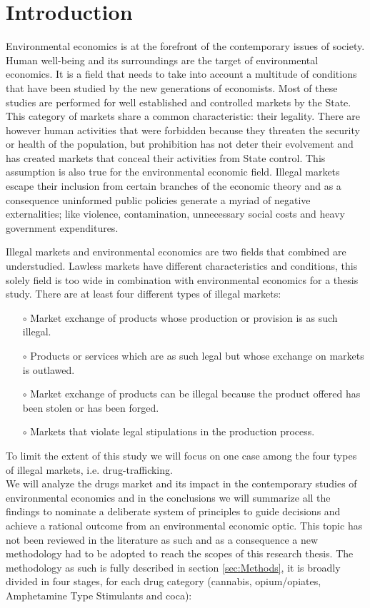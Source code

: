 \chapter*{Introduction} 

Environmental economics is at the forefront of the contemporary issues of society. Human well-being and its surroundings are the target of environmental economics. It is a field that needs to take into account a multitude of conditions that have been studied by the new generations of economists. Most of these studies are performed for well established and controlled markets by the State. This category of markets share a common characteristic: their legality. There are however human activities that were forbidden because they threaten the security or health of the population, but prohibition has not deter their evolvement  and has created markets that conceal their activities from State control. This assumption is also true for the environmental economic field. Illegal markets escape their inclusion from certain branches of the economic theory and as a consequence uninformed public policies generate a myriad of negative externalities; like violence, contamination, unnecessary social costs and heavy government expenditures.

Illegal markets and environmental economics are two fields that combined are understudied.
Lawless markets have different characteristics and conditions, this solely field is too wide in combination with environmental economics for a thesis study.
There are at least four different types of illegal markets: 
\begin{itemize}\justifying
\item[$\circ$] Market exchange of products whose production or provision is as such illegal.
\item[$\circ$] Products or services which are as such legal but whose exchange on markets is outlawed.
\item[$\circ$] Market exchange of products can be illegal because the product offered has been stolen or has been forged.
\item[$\circ$] Markets that violate legal stipulations in the production process.
\end{itemize} 
To limit the extent of this study we will focus on one case among the four types of illegal markets, i.e. drug-trafficking. \\
We will analyze the drugs market and its impact in the contemporary studies of environmental economics and in the conclusions we will summarize all the findings to nominate a deliberate system of principles to guide decisions and achieve a rational outcome from an environmental economic optic. This topic has not been reviewed in the literature as such and as a consequence a new methodology had to be adopted to reach the scopes of this research thesis. The methodology as such is fully described in section \ref{sec:Methods}, it is broadly divided in four stages, for each drug category (cannabis, opium/opiates, Amphetamine Type Stimulants and coca):

